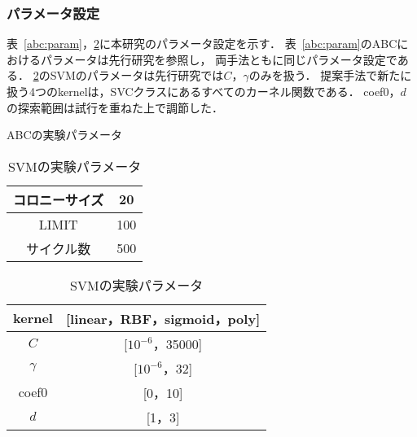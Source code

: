 \subsubsection{パラメータ設定}
表~\ref{abc:param}，\ref{svm:param}に本研究のパラメータ設定を示す．
表~\ref{abc:param}のABCにおけるパラメータは先行研究を参照し，
両手法ともに同じパラメータ設定である\cite{origin}．
\ref{svm:param}のSVMのパラメータは先行研究では$C$，$\gamma$のみを扱う．
提案手法で新たに扱う4つのkernelは，SVCクラスにあるすべてのカーネル関数である．
coef0，$d$の探索範囲は試行を重ねた上で調節した．
\begin{table}[tb]
    \centering
    \begin{minipage}{0.4\textwidth}  %
      \centering
      \caption{ABCの実験パラメータ}  %
      \begin{tabular}{|c|c|}  %
        \hline  %
        コロニーサイズ & 20 \\  %
        \hline  %
        LIMIT & 100 \\  %
        \hline  %
        サイクル数 & 500 \\  %
        \hline  %
      \end{tabular}
      \label{abc:param}  %
    \end{minipage}
    \begin{minipage}{0.5\textwidth}  %
      \centering
      \caption{SVMの実験パラメータ}  %
      \begin{tabular}{|c|c|}  %
        \hline  %
        kernel & [linear，RBF，sigmoid，poly] \\  %
        \hline  %
        $C$ & [$10^{-6}$，35000] \\  %
        \hline  %
        $\gamma$ & [$10^{-6}$，32] \\  %
        \hline  %
        coef0 & [0，10] \\  %
        \hline  %
        $d$ & [1，3] \\  %
        \hline  %
      \end{tabular}
      \label{svm:param}  %
    \end{minipage}
  \end{table}
